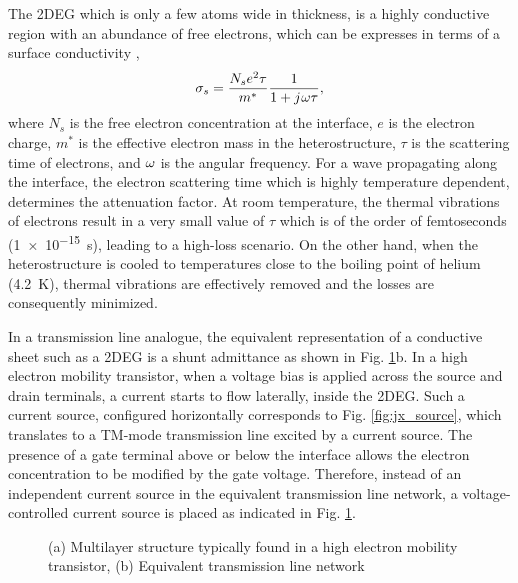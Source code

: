 \documentclass[12pt]{article}
\begin{document}
The 2DEG which is only a few atoms wide in thickness, is a highly conductive region with an abundance of free electrons, which can be expresses in terms of a surface conductivity \cite{Burke2000},
%
\begin{equation}
  \sigma_s = \frac{N_s e^2 \tau}{m^{\ast}}\frac{1}{1 + j\mkern1mu \omega \tau},
  \label{eq:sigma_s}
\end{equation}
%
where $N_s$ is the free electron concentration at the interface, $e$ is the electron charge, $m^{\ast}$ is the effective electron mass in the heterostructure, $\tau$ is the scattering time of electrons, and $\omega$ is the angular frequency. For a wave propagating along the interface, the electron scattering time which is highly temperature dependent, determines the attenuation factor. At room temperature, the thermal vibrations of electrons result in a very small value of $\tau$ which is of the order of femtoseconds (\SI{1e-15}{\s}), leading to a high-loss scenario. On the other hand, when the heterostructure is cooled to temperatures close to the boiling point of helium (\SI[round-precision=2]{4.2}{\kelvin}), thermal vibrations are effectively removed and the losses are consequently minimized.

In a transmission line analogue, the equivalent representation of a conductive sheet such as a 2DEG is a shunt admittance as shown in Fig. \ref{fig:TL_equivalent}b. In a high electron mobility transistor, when a voltage bias is applied across the source and drain terminals, a current starts to flow laterally, inside the 2DEG. Such a current source, configured horizontally corresponds to Fig. \ref{fig:jx_source}, which translates to a TM-mode transmission line excited by a current source. The presence of a gate terminal above or below the interface allows the electron concentration to be modified by the gate voltage. Therefore, instead of an independent current source in the equivalent transmission line network, a voltage-controlled current source is placed as indicated in Fig. \ref{fig:TL_equivalent}.
%
\begin{figure}[t!]
  \centering
  \def\svgwidth{\linewidth}
  
  \caption{(a) Multilayer structure typically found in a high electron mobility transistor, (b) Equivalent transmission line network}
  \label{fig:TL_equivalent}
\end{figure}
%
\end{document}
